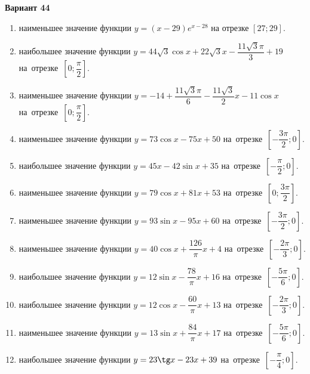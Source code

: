 \documentclass[a4paper,10pt]{article}
\begin{document}
\begin{center}\Large\textbf{Вариант 44}\end{center}

\begin{enumerate}
\item {} наименьшее значение функции $y = \left(x-29\right)e^{x-28}$ на отрезке $\left[27;29\right]$.

\item {} наибольшее значение функции $y = 44\sqrt{3}\cos x+22\sqrt{3}x-\dfrac{11\sqrt{3}\pi}{3} +19$ на~отрезке~$\left[0;\dfrac{\pi }{2}\right]$.

\item {} наименьшее значение функции $y = -14+\dfrac{11\sqrt{3} \pi}{6}-\dfrac{11\sqrt{3}}{2}x-11\cos x$ на~отрезке~$\left[0;\dfrac{\pi }{2}\right]$.

\item {} наименьшее значение функции $y = 73\cos x-75x+50$ на~отрезке~$\left[-\dfrac{3\pi }{2};0\right]$.

\item {} наибольшее значение функции $y = 45x-42\sin x+35$ на~отрезке~$\left[-\dfrac{\pi }{2};0\right]$.

\item {} наименьшее значение функции $y = 79\cos x+81x+53$ на~отрезке~$\left[0;\dfrac{3\pi }{2}\right]$.

\item {} наименьшее значение функции $y = 93\sin x-95x+60$ на~отрезке~$\left[-\dfrac{3\pi }{2};0\right]$.

\item {} наименьшее значение функции $y = 40\cos x+\dfrac{126}{\pi }x +4$ на~отрезке~$\left[-\dfrac{2\pi }{3};0\right]$.

\item {} наибольшее значение функции $y = 12\sin x-\dfrac{78}{\pi }x+16$ на~отрезке~$\left[-\dfrac{5\pi }{6};0\right]$.

\item {} наибольшее значение функции $y = 12\cos x-\dfrac{60}{\pi }x+13$ на~отрезке~$\left[-\dfrac{2\pi }{3};0\right]$.

\item {} наименьшее значение функции $y = 13\sin x+\dfrac{84}{\pi }x+17$ на~отрезке~$\left[-\dfrac{5\pi }{6};0\right]$.

\item {} наибольшее значение функции $y = 23\tg x-23x+39$ на~отрезке~$\left[-\dfrac{\pi }{4};0\right]$.


\end{enumerate}
\end{document}
